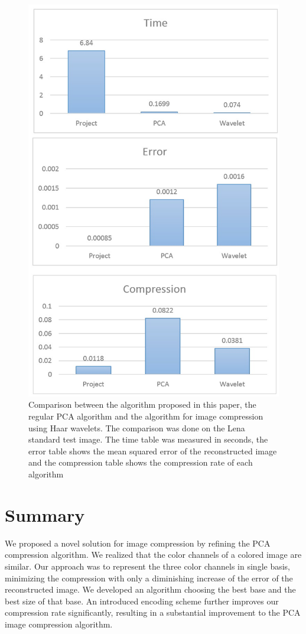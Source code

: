 \documentclass[10pt,conference,compsocconf]{IEEEtran}
\begin{document}
\begin{figure}[h!]
\centering
  \includegraphics[scale=0.4]{figures/Comparison.jpg}
  \caption{Comparison between the algorithm proposed in this paper, the regular PCA algorithm and the algorithm for image compression using Haar wavelets. The comparison was done on the Lena standard test image. The time table was measured in seconds, the error table shows the mean squared error of the reconstructed image and the compression table shows the compression rate of each algorithm}
  \label{fig:Comp}
\end{figure}
\section{Summary}
We proposed a novel solution for image compression by refining the PCA compression algorithm. We realized that the color channels of a colored image are similar. Our approach was to represent the three color channels in single basis, minimizing the compression with only a diminishing increase of the error of the reconstructed image. We developed an algorithm choosing the best base and the best size of that base. An introduced encoding scheme further improves our compression rate significantly, resulting in a substantial improvement to the PCA image compression algorithm.


  
\end{document}
